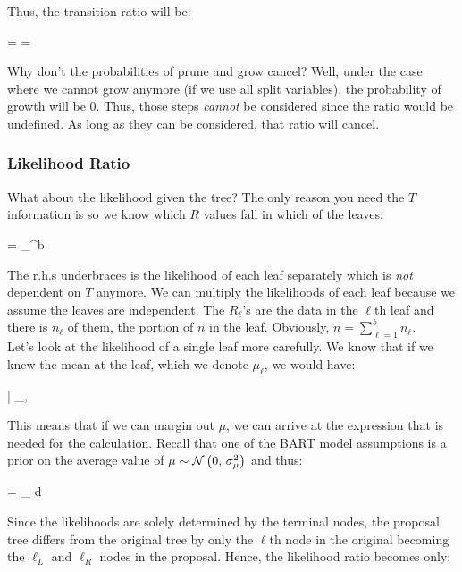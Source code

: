 Thus, the transition ratio will be:

\beqn
{} =  =  
\eeqn

Why don't the probabilities of prune and grow cancel? Well, under the case where we cannot grow anymore (if we use all split variables), the probability of growth will be 0. Thus, those steps \textit{cannot} be considered since the ratio would be undefined. As long as they can be considered, that ratio will cancel.

\subsubsection*{Likelihood Ratio}


What about the likelihood given the tree? The only reason you need the $T$ information is so we know which $R$ values fall in which of the leaves:

\beqn
{} = \prod_{}^{b} \underbrace{\cprob{\Rlonetonl}{\sigsq}}
\eeqn

The r.h.s underbraces is the likelihood of each leaf separately which is \textit{not} dependent on $T$ anymore. We can multiply the likelihoods of each leaf because we assume the leaves are independent. The $R_\ell$'s are the data in the $\ell$th leaf and there is $n_\ell$ of them, the portion of $n$ in the leaf. Obviously, $n = \sum_{\ell=1}^b n_\ell$.\\

Let's look at the likelihood of a single leaf more carefully. We know that if we knew the mean at the leaf, which we denote $\mu_\ell$, we would have:

\beqn
\Rlonetonl | \mu_\ell, \sigsq ~\iid~ \normnot{\mu}{\sigsq}
\eeqn

This means that if we can margin out $\mu$, we can arrive at the expression that is needed for the calculation. Recall that one of the BART model assumptions is a prior on the average value of $\mu \sim \mathcal{N}\left(0,\,\sigma^2_\mu\right)$ and thus:

\beqn
\cprob{\Rlonetonl}{\sigsq} = \int_\reals \cprob{\Rlonetonl}{\mu, \sigsq} \prob{\mu; \sigsq_\mu} d\mu
\eeqn

Since the likelihoods are solely determined by the terminal nodes, the proposal tree differs from the original tree by only the $\ell$th node in the original becoming the $\ell_L$ and $\ell_R$ nodes in the proposal. Hence, the likelihood ratio becomes only:

